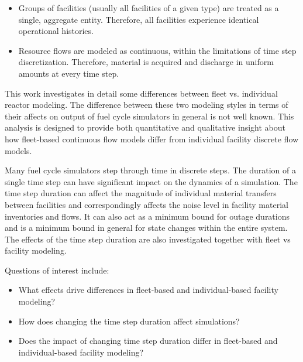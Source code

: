 \documentclass{style}
\begin{document}
\begin{itemize}

    \item Groups of facilities (usually all facilities of a given type) are
        treated as a single, aggregate entity. Therefore, all facilities experience
        identical operational histories.

    \item Resource flows are modeled as continuous, within the limitations of time
        step discretization.  Therefore, material is acquired and discharge in
        uniform amounts at every time step.

\end{itemize}

This work investigates in detail some differences between fleet vs. individual
reactor modeling.  The difference between these two modeling styles in terms
of their affects on output of fuel cycle simulators in general is not well
known. This analysis is designed to provide both quantitative and
qualitative insight about how fleet-based continuous flow models differ from
individual facility discrete flow models.

Many fuel cycle simulators step through time in discrete steps.  The duration
of a single time step can have significant impact on the dynamics of a
simulation.  The time step duration can affect the magnitude of individual
material transfers between facilities and correspondingly affects the noise
level in facility material inventories and flows.  It can also act as a
minimum bound for outage durations and is a minimum bound in general for state
changes within the entire system. The effects of the time step duration are
also investigated together with fleet vs facility modeling.

Questions of interest include:

\begin{itemize}

    \item What effects drive differences in fleet-based and individual-based
        facility modeling?

    \item How does changing the time step duration affect simulations?

    \item Does the impact of changing time step duration differ in fleet-based
        and individual-based facility modeling?

\end{itemize}
\end{document}
